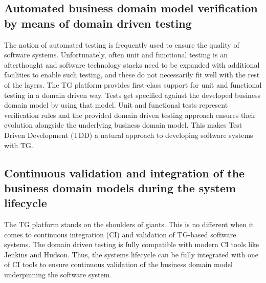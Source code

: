 \documentclass[a4paper,10pt,oneside,openright,final]{memoir} %
\begin{document}
\subsection*{Automated business domain model verification by means of domain driven testing}
	The notion of automated testing is frequently used to ensure the quality of software systems.
	Unfortunately, often unit and functional testing is an afterthought and software technology stacks need to be expanded with additional facilities to enable such testing, and these do not necessarily fit well with the rest of the layers.
	The TG platform provides first-class support for unit and functional testing in a domain driven way.
	Tests get specified against the developed business domain model by using that model.
	Unit and functional tests represent verification rules and the provided domain driven testing approach ensures their evolution alongside the underlying business domain model.
	This makes Test Driven Development (TDD) a natural approach to developing software systems with TG.
	
\subsection*{Continuous validation and integration of the business domain models during the system lifecycle}
	The TG platform stands on the shoulders of giants.
	This is no different when it comes to continuous integration (CI) and validation of TG-based software systems.
	The domain driven testing is fully compatible with modern CI tools like Jenkins and Hudson.
	Thus, the systems lifecycle can be fully integrated with one of CI tools to ensure continuous validation of the business domain model underpinning the software system.
\end{document}
